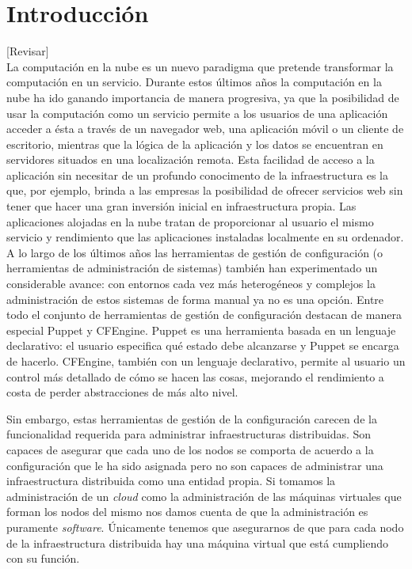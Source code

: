 \chapter{Introducción}
\label{cap:introduccion}

[Revisar]\\

La computación en la nube es un nuevo paradigma que pretende transformar la computación en un servicio. Durante estos últimos años la computación en la nube ha ido ganando importancia de manera progresiva, ya que la posibilidad de usar la computación como un servicio permite a los usuarios de una aplicación acceder a ésta a través de un navegador web, una aplicación móvil o un cliente de escritorio, mientras que la lógica de la aplicación y los datos se encuentran en servidores situados en una localización remota. Esta facilidad de acceso a la aplicación sin necesitar de un profundo conocimento de la infraestructura es la que, por ejemplo, brinda a las empresas la posibilidad de ofrecer servicios web sin tener que hacer una gran inversión inicial en infraestructura propia. Las aplicaciones alojadas en la nube tratan de proporcionar al usuario el mismo servicio y rendimiento que las aplicaciones instaladas localmente en su ordenador.\\

A lo largo de los últimos años las herramientas de gestión de configuración (o herramientas de administración de sistemas) también han experimentado un considerable avance: con entornos cada vez más heterogéneos y complejos la administración de estos sistemas de forma manual ya no es una opción. Entre todo el conjunto de herramientas de gestión de configuración destacan de manera especial Puppet \cite{puppetlabs} y CFEngine. Puppet es una herramienta basada en un lenguaje declarativo: el usuario especifica qué estado debe alcanzarse y Puppet se encarga de hacerlo. CFEngine, también con un lenguaje declarativo, permite al usuario un control más detallado de cómo se hacen las cosas, mejorando el rendimiento a costa de perder abstracciones de más alto nivel.

Sin embargo, estas herramientas de gestión de la configuración carecen de la funcionalidad requerida para administrar infraestructuras distribuidas. Son capaces de asegurar que cada uno de los nodos se comporta de acuerdo a la configuración que le ha sido asignada pero no son capaces de administrar una infraestructura distribuida como una entidad propia. Si tomamos la administración de un \emph{cloud} como la administración de las máquinas virtuales que forman los nodos del mismo nos damos cuenta de que la administración es puramente \emph{software}. Únicamente tenemos que asegurarnos de que para cada nodo de la infraestructura distribuida hay una máquina virtual que está cumpliendo con su función.\\

